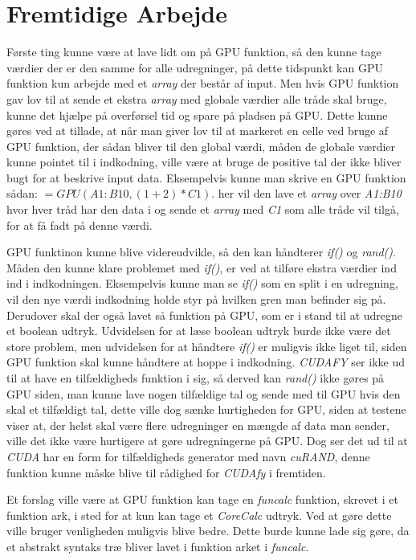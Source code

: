 \section{Fremtidige Arbejde}
\label{FA}
Første ting kunne være at lave lidt om på GPU funktion, så den kunne tage værdier der er den samme for alle udregninger, på dette tidspunkt kan GPU funktion kun arbejde med et \textit{array} der består af input. Men hvis GPU funktion gav lov til at sende et ekstra \textit{array} med globale værdier alle tråde skal bruge, kunne det hjælpe på overførsel tid og spare på pladsen på GPU. Dette kunne gøres ved at tillade, at når man giver lov til at markeret en celle ved bruge af GPU funktion, der sådan bliver til den global værdi, måden de globale værdier kunne pointet til i indkodning, ville være at bruge de positive tal der ikke bliver bugt for at beskrive input data. Eksempelvis kunne man skrive en GPU funktion sådan: $=GPU(A1:B10, (1+2)*C1)$. her vil den lave et \textit{array} over \textit{A1:B10} hvor hver tråd har den data i og sende et \textit{array} med \textit{C1} som alle tråde vil tilgå, for at få fadt på denne værdi.

GPU funktinon kunne blive videreudvikle, så den kan håndterer \textit{if()} og \textit{rand()}. Måden den kunne klare problemet med \textit{if()}, er ved at tilføre ekstra værdier ind ind i indkodningen. Eksempelvis kunne man se \textit{if()} som en split i en udregning, vil den nye værdi indkodning holde styr på hvilken gren man befinder sig på. Derudover skal der også lavet så funktion på GPU, som er i stand til at udregne et boolean udtryk. Udvidelsen for at læse boolean udtryk burde ikke være det store problem, men udvidelsen for at håndtere \textit{if()} er muligvis ikke liget til, siden GPU funktion skal kunne håndtere at hoppe i indkodning. \textit{CUDAFY} ser ikke ud til at have en tilfældigheds funktion i sig, så derved kan \textit{rand()} ikke gøres på GPU siden, man kunne lave nogen tilfældige tal og sende med til GPU hvis den skal et tilfældigt tal, dette ville dog sænke hurtigheden for GPU, siden at testene viser at, der helst skal være flere udregninger en mængde af data man sender, ville det ikke være hurtigere at gøre udregningerne på GPU. Dog ser det ud til at \textit{CUDA} har  en form for tilfældigheds generator med navn \textit{cuRAND}, denne funktion kunne måske blive til rådighed for \textit{CUDAfy} i fremtiden. 

Et forslag ville være at GPU funktion kan tage en \textit{funcalc} funktion, skrevet i et funktion ark, i sted for at kun kan tage et \textit{CoreCalc} udtryk. Ved at gøre dette ville bruger venligheden muligvis blive bedre. Dette burde kunne lade sig gøre, da et abstrakt syntaks træ bliver lavet i funktion arket i \textit{funcalc}.

